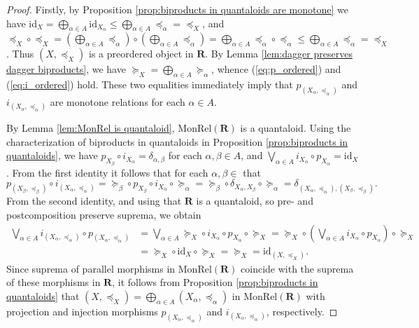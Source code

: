 \documentclass[12pt]{tac}
\theoremstyle{definition}
\theoremstyle{remark}
\newcommand{\qo}{{\boldsymbol{\preccurlyeq}}}
\newcommand{\qop}{{\boldsymbol{\succcurlyeq}}}
\newcommand{\<}{\langle}
\renewcommand{\>}{\rangle}
\renewcommand{\:}{\colon}
\newcommand{\id}{\mathrm{id}}
\begin{document}
\begin{proof}
 Firstly, by  Proposition \ref{prop:biproducts in quantaloids are monotone} we have $\id_X=\bigoplus_{\alpha\in A}\id_{X_\alpha}\leq \bigoplus_{\alpha\in A}\qo_\alpha=\qo_X$, and $\qo_X\circ\qo_X=\left(\bigoplus_{\alpha\in A}\qo_\alpha\right)\circ\left(\bigoplus_{\alpha\in A}\qo_\alpha\right)=\bigoplus_{\alpha\in A}\qo_\alpha\circ\qo_\alpha\leq\bigoplus_{\alpha\in A}\qo_\alpha=\qo_X$. Thus $(X,\qo_X)$ is a preordered object in $\mathbf R$.
By Lemma \ref{lem:dagger preserves dagger biproducts}, we have $\qop_X=\bigoplus_{\alpha\in A}\qop_\alpha$, whence (\ref{eq:p_ordered}) and (\ref{eq:i_ordered}) hold. These two equalities immediately imply that $p_{(X_\alpha,\qo_\alpha)} $ and $i_{(X_\alpha,\qo_\alpha)}$ are monotone relations for each $\alpha\in A$. 

By Lemma \ref{lem:MonRel is quantaloid}, $\mathrm{MonRel}(\mathbf R)$ is a quantaloid.
Using the characterization of biproducts in quantaloids in 
    Proposition \ref{prop:biproducts in quantaloids}, we have $p_{X_\beta}\circ i_{X_\alpha}=\delta_{\alpha,\beta}$ for each $\alpha,\beta\in A$, and $\bigvee_{\alpha\in A}i_{X_\alpha}\circ p_{X_\alpha}=\id_X$. From the first identity it follows that for each $\alpha,\beta\in $ that
    \[p_{(X_\beta,\qo_\beta)}\circ i_{(X_\alpha,\qo_\alpha)}=\qop_\beta\circ p_{X_\beta}\circ i_{X_\alpha}\circ\qop_\alpha=\qop_\beta\circ\delta_{X_\alpha,X_\beta}\circ\qop_\alpha=\delta_{(X_\alpha,\qo_\alpha),(X_\beta,\qo_\beta)}.\]
        From the second identity, and using that $\mathbf R$ is a quantaloid, so pre- and postcomposition preserve suprema, we obtain
    \begin{align*}\bigvee_{\alpha\in A}i_{(X_\alpha,\qo_\alpha)}\circ p_{(X_\alpha,\qo_\alpha)}& =\bigvee_{\alpha\in A}\qop_X\circ i_{X_\alpha}\circ p_{X_\alpha}
        \circ \qop_X=\qop_X\circ\left(\bigvee_{\alpha\in A}i_{X_\alpha}\circ p_{X_\alpha}\right)\circ\qop_X\\
    & =\qop_X\circ\id_X\circ\qop_X=\qop_X=\id_{(X,\qo_X)}.\end{align*}
    Since suprema of parallel morphisms in $\mathrm{MonRel}(\mathbf R)$ coincide with the suprema of these morphisms in $\mathbf R$, it follows from Proposition \ref{prop:biproducts in quantaloids} that $(X,\qo_X)=\bigoplus_{\alpha\in A}(X_\alpha,\qo_\alpha)$ in $\mathrm{MonRel}(\mathbf R)$ with projection and injection morphisms $p_{(X_\alpha,\qo_\alpha)}$ and $i_{(X_\alpha,\qo_\alpha)}$, respectively.
\end{proof}
\end{document}
